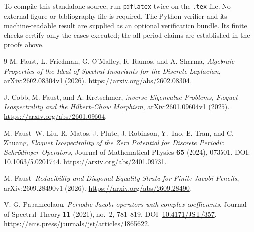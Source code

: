 \documentclass[11pt,a4paper]{article}
\theoremstyle{definition}
\theoremstyle{remark}
\begin{document}
To compile this standalone source, run \texttt{pdflatex} twice on the
\texttt{.tex} file. No external figure or bibliography file is required.
The Python verifier and its machine-readable result are supplied as an
optional verification bundle. Its finite checks certify only the cases
executed; the all-period claims are established in the proofs above.

\begin{thebibliography}{9}
M. Faust, L. Friedman, G. O'Malley, R. Ramos, and A. Sharma,
\emph{Algebraic Properties of the Ideal of Spectral Invariants for the
Discrete Laplacian}, arXiv:2602.08304v1 (2026).
\url{https://arxiv.org/abs/2602.08304}.

J. Cobb, M. Faust, and A. Kretschmer,
\emph{Inverse Eigenvalue Problems, Floquet Isospectrality and the
Hilbert--Chow Morphism}, arXiv:2601.09604v1 (2026).
\url{https://arxiv.org/abs/2601.09604}.

M. Faust, W. Liu, R. Matos, J. Plute, J. Robinson, Y. Tao, E. Tran, and C. Zhuang,
\emph{Floquet Isospectrality of the Zero Potential for Discrete Periodic
Schr\"odinger Operators}, Journal of Mathematical Physics \textbf{65}
(2024), 073501. DOI: \href{https://doi.org/10.1063/5.0201744}{10.1063/5.0201744}.
\url{https://arxiv.org/abs/2401.09731}.

M. Faust, \emph{Reducibility and Diagonal Equality Strata for Finite
Jacobi Pencils}, arXiv:2609.28490v1 (2026).
\url{https://arxiv.org/abs/2609.28490}.

V. G. Papanicolaou,
\emph{Periodic Jacobi operators with complex coefficients},
Journal of Spectral Theory \textbf{11} (2021), no.~2, 781--819.
DOI: \href{https://doi.org/10.4171/JST/357}{10.4171/JST/357}.
\url{https://ems.press/journals/jst/articles/1865622}.
\end{thebibliography}
\end{document}
